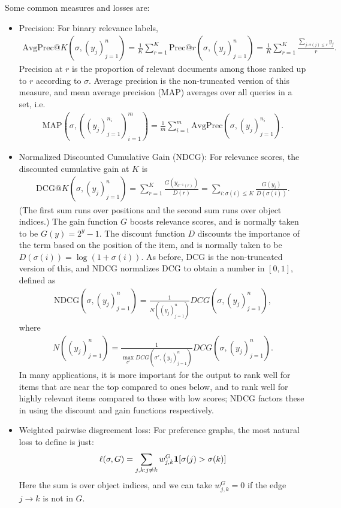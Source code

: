 Some common measures and losses are:
\begin{itemize}
\item Precision: For binary relevance labels, 
  \begin{align*}
    \text{AvgPrec}@K(\sigma, (y_j)_{j=1}^n)
    = \frac{1}{K} \sum_{r=1}^K \text{Prec}@r(\sigma, (y_j)_{j=1}^n)
    = \frac{1}{K} \sum_{r=1}^K \frac{\sum_{j : \sigma(j) \leq r} y_j}{r}.
  \end{align*}
  Precision at $r$ is the proportion of relevant documents among those 
  ranked up to $r$ according to $\sigma$. Average precision is the
  non-truncated version of this measure, and mean average precision (MAP)
  averages  over all queries in a set, i.e.
  \begin{align*}
    \text{MAP}(\sigma, ((y_j)_{j=1}^{n_i})_{i=1}^m) =
    \frac{1}{m} \sum_{i=1}^m \text{AvgPrec}(\sigma, (y_j)_{j=1}^{n_i}).
  \end{align*}
\item Normalized Discounted Cumulative Gain (NDCG): For relevance scores,
  the discounted cumulative gain at $K$ is 
  \begin{align*}
    \text{DCG}@K(\sigma, (y_j)_{j=1}^n)
    = \sum_{r=1}^K \frac{G(y_{\sigma^{-1}(r)})}{D(r)}
    = \sum_{i: \sigma(i) \leq K} \frac{G(y_i)}{D(\sigma(i))}.
  \end{align*}
  (The first sum runs over positions and the second sum runs over
  object indices.) The gain function $G$ boosts relevance scores, and is
  normally taken to be $G(y) = 2^y - 1$. The discount function $D$ discounts
  the importance of the term based on the position of the item, and is
  normally taken to be $D(\sigma(i)) = \log(1 + \sigma(i))$. As before, DCG
  is the non-truncated version of this, and NDCG normalizes DCG to obtain
  a number in $[0,1]$, defined as
  \begin{align*}
    \text{NDCG}(\sigma, (y_j)_{j=1}^n)
    = \frac{1}{N((y_j)_{j=1}^n)} DCG(\sigma, (y_j)_{j=1}^n),
  \end{align*}
  where
  \begin{align*}
    N((y_j)_{j=1}^n)
    = \frac{1}{\max_{\sigma'} DCG(\sigma', (y_j)_{j=1}^n)} DCG(\sigma, (y_j)_{j=1}^n).
  \end{align*}
  In many applications, it is more important for the output to rank well for
  items that are near the top compared to ones below, and to rank well for
  highly relevant items compared to those with low scores; NDCG factors
  these in using the discount and gain functions respectively.

\item Weighted pairwise disgreement loss: For preference graphs, the most
  natural loss to define is just:
  \begin{align*}
    \ell(\sigma, G)
    = \sum_{j,k: j \neq k} w_{j,k}^G {\mathbf 1}[\sigma(j) > \sigma(k)]
  \end{align*}
  Here the sum is over object indices, and we can take $w_{j,k}^G = 0$ if
  the edge $j \to k$ is not in $G$. 
\end{itemize}
